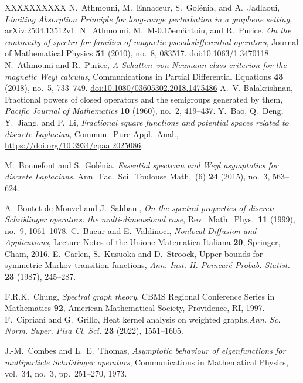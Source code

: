 \documentclass[10pt]{amsart}
\newcommand{\1}{{\mathbb{I}}}
\numberwithin{equation}{section}
\begin{document}
\begin{thebibliography}{XXXXXXXXXX}
 N.\ Athmouni, M.\ Ennaceur, S.\ Gol\'enia, and A.\ Jadlaoui, \emph{Limiting Absorption Principle for long-range perturbation in a graphene setting}, arXiv:2504.13512v1.
N.~Athmouni, M.~M\kern-0.15em\u{a}ntoiu, and R.~Purice,
\emph{On the continuity of spectra for families of magnetic pseudodifferential operators},
Journal of Mathematical Physics \textbf{51} (2010), no.~8, 083517.
\href{https://doi.org/10.1063/1.3470118}{doi:10.1063/1.3470118}.
N.~Athmouni and R.~Purice,
\emph{A Schatten--von Neumann class criterion for the magnetic Weyl calculus},
Communications in Partial Differential Equations \textbf{43} (2018), no.~5, 733--749.
\href{https://doi.org/10.1080/03605302.2018.1475486}{doi:10.1080/03605302.2018.1475486}
A.~V. Balakrishnan,
Fractional powers of closed operators and the semigroups generated by them,
\emph{Pacific Journal of Mathematics} \textbf{10} (1960), no.~2, 419--437.
 Y.\ Bao, Q.\ Deng, Y.\ Jiang, and P.\ Li, \emph{Fractional square functions and potential spaces related to discrete Laplacian}, Commun.\ Pure Appl.\ Anal., \url{https://doi.org/10.3934/cpaa.2025086}.


 M.\ Bonnefont and S.\ Gol\'enia, \emph{Essential spectrum and Weyl asymptotics for discrete Laplacians}, Ann.\ Fac.\ Sci.\ Toulouse Math.\ (6) {\bf 24} (2015), no.\ 3, 563--624.

 A.\ Boutet de Monvel and J.\ Sahbani, \emph{On the spectral properties of discrete Schr\"odinger operators: the multi-dimensional case}, Rev.\ Math.\ Phys.\ {\bf 11} (1999), no.\ 9, 1061--1078.
 C.\ Bucur and E.\ Valdinoci, \emph{Nonlocal Diffusion and Applications}, Lecture Notes of the Unione Matematica Italiana {\bf 20}, Springer, Cham, 2016.
E.~Carlen, S.~Kusuoka and D.~Stroock, Upper bounds for symmetric Markov transition functions,
\emph{Ann. Inst. H. Poincaré Probab. Statist.} \textbf{23} (1987), 245--287.

 F.R.K.\ Chung, \emph{Spectral graph theory}, CBMS Regional Conference Series in Mathematics {\bf 92}, American Mathematical Society, Providence, RI, 1997.
 F.~Cipriani and G.~Grillo, Heat kernel analysis on weighted graphs,\emph{Ann. Sc. Norm. Super. Pisa Cl. Sci.} \textbf{23} (2022), 1551--1605.

J.-M.~Combes and L.~E.~Thomas,
 \emph{Asymptotic behaviour of eigenfunctions for multiparticle Schrödinger operators},
Communications in Mathematical Physics, vol.~34, no.~3, pp.~251--270, 1973.



\end{thebibliography}
\end{document}
